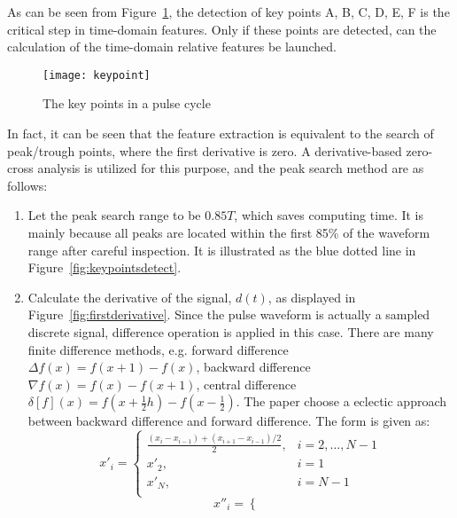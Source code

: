 As can be seen from Figure~\ref{fig:keypoint}, the detection of key points A,
B, C, D, E, F is the critical step in time-domain features. Only if
these points are detected, can the calculation of the time-domain
relative features be launched. 
\begin{figure}[htpb]
    \begin{center}
        \texttt{[image: keypoint]}
    \end{center}
    \caption{The key points in a pulse cycle}
    \label{fig:keypoint}
\end{figure}
In fact, it can be seen that the
feature extraction is equivalent to the search of peak/trough points,
where the first derivative is zero. A derivative-based zero-cross
analysis is utilized for this purpose, and the peak search method are as follows:
\begin{enumerate}[(1)]
    \item Let the peak search range to be $0.85T$, which saves computing
        time. It is mainly because
        all peaks are located within the first 85\% of the waveform
        range after careful inspection. It is illustrated as the blue
        dotted line in Figure~\ref{fig:keypointsdetect}.
    \item Calculate the derivative of the signal, $d(t)$, as displayed
        in Figure~\ref{fig:firstderivative}. Since the pulse
        waveform is actually a sampled discrete signal, difference
        operation is applied in this case. There are many finite difference
        methods, e.g. forward difference $\Delta f(x)=f(x+1)-f(x)$,
        backward difference $\nabla f(x)=f(x)-f(x+1)$, central
        difference $\delta[f](x)=f(x+\frac{1}{2}h)-f(x-\frac{1}{2})$.
        The paper choose a eclectic approach between backward
        difference and forward difference. The form is given as:
        \begin{equation}
            x'_i=\left\{ 
            \begin{array}{ll}
                \frac{(x_i-x_{i-1})+(x_{i+1}-x_{i-1})/2}{2}, & i=2,\ldots,N-1\\
                x'_2, & i=1\\
                x'_N, & i=N-1\\
            \end{array} \right.
            \label{equ:1stdiff}
        \end{equation}
        \begin{equation}
            x''_i=\left\{ 
            \begin{array}{ll}

\end{array}
\end{equation}
\end{enumerate}
